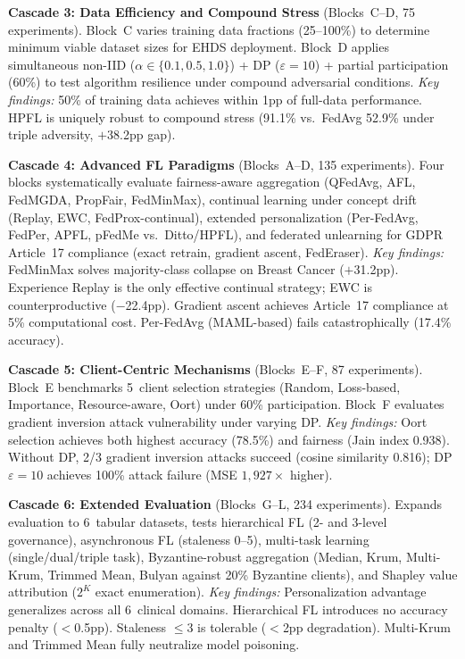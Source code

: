 \documentclass[conference]{IEEEtran}
\begin{document}
\smallskip\noindent\textbf{Cascade 3: Data Efficiency and Compound Stress} (Blocks~C--D, 75 experiments). Block~C varies training data fractions (25--100\%) to determine minimum viable dataset sizes for EHDS deployment. Block~D applies simultaneous non-IID ($\alpha \in \{0.1, 0.5, 1.0\}$) + DP ($\varepsilon{=}10$) + partial participation (60\%) to test algorithm resilience under compound adversarial conditions. \textit{Key findings:} 50\% of training data achieves within 1pp of full-data performance. HPFL is uniquely robust to compound stress (91.1\% vs.\ FedAvg 52.9\% under triple adversity, $+$38.2pp gap).

\smallskip\noindent\textbf{Cascade 4: Advanced FL Paradigms} (Blocks~A--D, 135 experiments). Four blocks systematically evaluate fairness-aware aggregation (QFedAvg, AFL, FedMGDA, PropFair, FedMinMax), continual learning under concept drift (Replay, EWC, FedProx-continual), extended personalization (Per-FedAvg, FedPer, APFL, pFedMe vs.\ Ditto/HPFL), and federated unlearning for GDPR Article~17 compliance (exact retrain, gradient ascent, FedEraser). \textit{Key findings:} FedMinMax solves majority-class collapse on Breast Cancer ($+$31.2pp). Experience Replay is the only effective continual strategy; EWC is counterproductive ($-$22.4pp). Gradient ascent achieves Article~17 compliance at 5\% computational cost. Per-FedAvg (MAML-based) fails catastrophically (17.4\% accuracy).

\smallskip\noindent\textbf{Cascade 5: Client-Centric Mechanisms} (Blocks~E--F, 87 experiments). Block~E benchmarks 5~client selection strategies (Random, Loss-based, Importance, Resource-aware, Oort) under 60\% participation. Block~F evaluates gradient inversion attack vulnerability under varying DP. \textit{Key findings:} Oort selection achieves both highest accuracy (78.5\%) and fairness (Jain index 0.938). Without DP, 2/3 gradient inversion attacks succeed (cosine similarity 0.816); DP $\varepsilon{=}10$ achieves 100\% attack failure (MSE $1{,}927\times$ higher).

\smallskip\noindent\textbf{Cascade 6: Extended Evaluation} (Blocks~G--L, 234 experiments). Expands evaluation to 6~tabular datasets, tests hierarchical FL (2- and 3-level governance), asynchronous FL (staleness 0--5), multi-task learning (single/dual/triple task), Byzantine-robust aggregation (Median, Krum, Multi-Krum, Trimmed Mean, Bulyan against 20\% Byzantine clients), and Shapley value attribution ($2^K$ exact enumeration). \textit{Key findings:} Personalization advantage generalizes across all 6~clinical domains. Hierarchical FL introduces no accuracy penalty ($<$0.5pp). Staleness $\leq$3 is tolerable ($<$2pp degradation). Multi-Krum and Trimmed Mean fully neutralize model poisoning.
\end{document}
